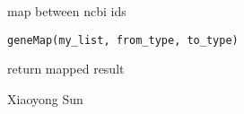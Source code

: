 \begin{Description}\relax
map between ncbi ids
\end{Description}
\begin{Usage}
\begin{verbatim}
geneMap(my_list, from_type, to_type)
\end{verbatim}
\end{Usage}
\begin{Arguments}
\begin{ldescription}
\item[\code{my\_list}] 
\item[\code{from\_type}] 
\item[\code{to\_type}] 
\end{ldescription}
\end{Arguments}
\begin{Value}
return mapped result
\end{Value}
\begin{Author}\relax
Xiaoyong Sun
\end{Author}

